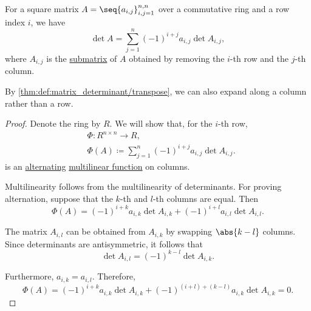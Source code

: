 \begin{theorem}\label{thm:laplace_expansion}
  For a square matrix \( A = \seq{ a_{i,j} }_{i,j=1}^{n,n} \) over a commutative ring and a row index \( i \), we have
  \begin{equation*}
    \det A = \sum_{j=1}^n (-1)^{i + j} a_{i,j} \det A_{i,j},
  \end{equation*}
  where \( A_{i,j} \) is the \hyperref[def:submatrix]{submatrix} of \( A \) obtained by removing the \( i \)-th row and the \( j \)-th column.

  By \cref{thm:def:matrix_determinant/transpose}, we can also expand along a column rather than a row.
\end{theorem}
\begin{proof}
  Denote the ring by \( R \). We will show that, for the \( i \)-th row,
  \begin{equation*}
    \begin{aligned}
      &\Phi: R^{n \times n} \to R, \\
      &\Phi(A) \coloneqq \sum_{j=1}^n (-1)^{i + j} a_{i,j} \det A_{i,j}.
    \end{aligned}
  \end{equation*}
  is an \hyperref[def:alternating_function]{alternating} \hyperref[def:multilinear_function]{multilinear function} on columns.

  Multilinearity follows from the multilinearity of determinants. For proving alternation, suppose that the \( k \)-th and \( l \)-th columns are equal. Then
  \begin{equation*}
    \Phi(A) = (-1)^{i + k} a_{i,k} \det A_{i,k} + (-1)^{i + l} a_{i,l} \det A_{i,l}.
  \end{equation*}

  The matrix \( A_{i,l} \) can be obtained from \( A_{i,k} \) by swapping \( \abs{k - l} \) columns. Since determinants are antisymmetric, it follows that
  \begin{equation*}
    \det A_{i,l} = (-1)^{k - l} \det A_{i,k}.
  \end{equation*}

  Furthermore, \( a_{i,k} = a_{i,l} \). Therefore,
  \begin{equation*}
    \Phi(A) = (-1)^{i + k} a_{i,k} \det A_{i,k} + (-1)^{(i + l) + (k - l)} a_{i,k} \det A_{i,k} = 0.
  \end{equation*}
\end{proof}

